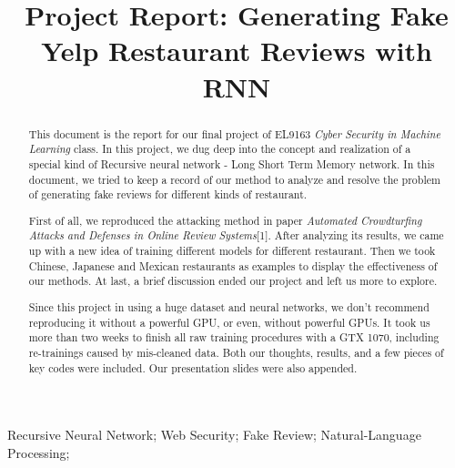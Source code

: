 \documentclass[conference]{IEEEtran}
\begin{document}
\title{Project Report: Generating Fake Yelp Restaurant Reviews with RNN\\}
\author{
\and
{}
}
\maketitle

\begin{abstract}
This document is the report for our final project of EL9163 \emph{Cyber Security in Machine Learning} class. In this project, we dug deep into the concept and realization of a special kind of Recursive neural network - Long Short Term Memory network. In this document, we tried to keep a record of our method to analyze and resolve the problem of generating fake reviews for different kinds of restaurant.
\par First of all, we reproduced the attacking method in paper \emph{Automated Crowdturfing Attacks and Defenses in Online Review Systems}[1]. After analyzing its results, we came up with a new idea of training different models for different restaurant. Then we took Chinese, Japanese and Mexican restaurants as examples to display the effectiveness of our methods. At last, a brief discussion ended our project and left us more to explore.
\par
Since this project in using a huge dataset and neural networks, we don't recommend reproducing it without a powerful GPU, or even, without powerful GPUs. It took us more than two weeks to finish all raw training procedures with a GTX 1070, including re-trainings caused by mis-cleaned data. Both our thoughts, results, and a few pieces of key codes were included. Our presentation slides were also appended.\\
\end{abstract}


\begin{IEEEkeywords}
Recursive Neural Network; Web Security; Fake Review; Natural-Language Processing;
\end{IEEEkeywords}
\end{document}
